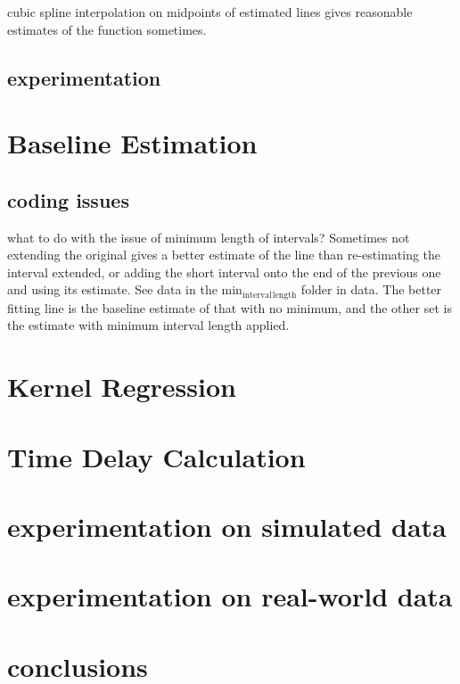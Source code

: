 \documentclass[11pt]{article}
\begin{document}
cubic spline interpolation on midpoints of estimated lines gives reasonable estimates of the function sometimes.


\subsection{experimentation}
\label{sec-5.3}

\section{Baseline Estimation}
\label{sec-6}

\subsection{coding issues}
\label{sec-6.1}

what to do with the issue of minimum length of intervals? Sometimes not extending the original gives a better estimate of the line than
re-estimating the interval extended, or adding the short interval onto the end of the previous one and using its estimate. See data in the
min$_{\mathrm{interval}}$$_{\mathrm{length}}$ folder in data. The better fitting line is the baseline estimate of that with no minimum, and the other set is the estimate
with minimum interval length applied.
\section{Kernel Regression}
\label{sec-7}

\section{Time Delay Calculation}
\label{sec-8}

\section{experimentation on simulated data}
\label{sec-9}

\section{experimentation on real-world data}
\label{sec-10}

\section{conclusions}
\label{sec-11}
\end{document}
